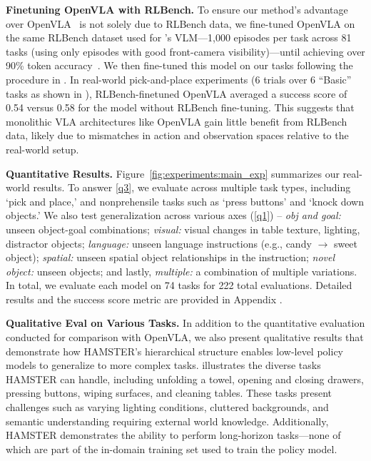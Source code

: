 \textbf{Finetuning OpenVLA with RLBench.}  
To ensure our method's advantage over OpenVLA~\citep{kim2024openvla} is not solely due to RLBench data, we fine-tuned OpenVLA on the same RLBench dataset used for \method's VLM—1,000 episodes per task across 81 tasks (using only episodes with good front-camera visibility)—until achieving over 90\% token accuracy~\citep{kim2024openvla}. We then fine-tuned this model on our tasks following the procedure in . In real-world pick-and-place experiments (6 trials over 6 ``Basic'' tasks as shown in ), RLBench-finetuned OpenVLA averaged a success score of 0.54 versus 0.58 for the model without RLBench fine-tuning. This suggests that monolithic VLA architectures like OpenVLA gain little benefit from RLBench data, likely due to mismatches in action and observation spaces relative to the real-world setup.

\textbf{Quantitative Results.} Figure~\ref{fig:experiments:main_exp} summarizes our real-world results. To answer \ref{q3}, we evaluate across multiple task types, including `pick and place,' and nonprehensile tasks such as `press buttons' and `knock down objects.' We also test generalization across various axes (\ref{q1}) -- \emph{obj and goal:} unseen object-goal combinations; \emph{visual:} visual changes in table texture, lighting, distractor objects; \emph{language:} unseen language instructions (e.g., candy $\rightarrow$ sweet object); \emph{spatial:} unseen spatial object relationships in the instruction; \emph{novel object:} unseen objects; and lastly, \emph{multiple:} a combination of multiple variations. 
In total, we evaluate each model on 74 tasks for 222 total evaluations. Detailed results and the success score metric are provided in Appendix . %

\textbf{Qualitative Eval on Various Tasks.} In addition to the quantitative evaluation conducted for comparison with OpenVLA, we also present qualitative results that demonstrate how HAMSTER’s hierarchical structure enables low-level policy models to generalize to more complex tasks.  illustrates the diverse tasks HAMSTER can handle, including unfolding a towel, opening and closing drawers, pressing buttons, wiping surfaces, and cleaning tables. These tasks present challenges such as varying lighting conditions, cluttered backgrounds, and semantic understanding requiring external world knowledge. Additionally, HAMSTER demonstrates the ability to perform long-horizon tasks—none of which are part of the in-domain training set used to train the policy model.

